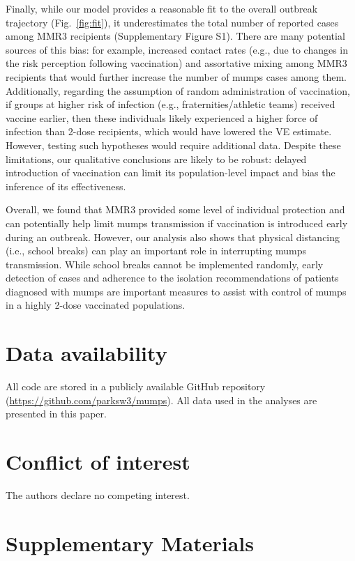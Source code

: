 \documentclass[12pt]{article}
\newcommand{\fref}[1]{Fig.~\ref{fig:#1}}
\begin{document}
Finally, while our model provides a reasonable fit to the overall outbreak trajectory (\fref{fit}), it underestimates the total number of reported cases among MMR3 recipients (Supplementary Figure S1).
There are many potential sources of this bias: for example, increased contact rates (e.g., due to changes in the risk perception following vaccination) and assortative mixing among MMR3 recipients that would further increase the number of mumps cases among them.
Additionally, regarding the assumption of random administration of vaccination, if groups at higher risk of infection (e.g., fraternities/athletic teams) received vaccine earlier, then these individuals likely experienced a higher force of infection than 2-dose recipients, which would have lowered the VE estimate. 
However, testing such hypotheses would require additional data.
Despite these limitations, our qualitative conclusions are likely to be robust: delayed introduction of vaccination can limit its population-level impact and bias the inference of its effectiveness.

Overall, we found that MMR3 provided some level of individual protection and can potentially help limit mumps transmission if vaccination is introduced early during an outbreak.  
However, our analysis also shows that physical distancing (i.e., school breaks) can play an important role in interrupting mumps transmission. 
While school breaks cannot be implemented randomly, early detection of cases and adherence to the isolation recommendations of patients diagnosed with mumps are important measures to assist with control of mumps in a highly 2-dose vaccinated populations.

\section*{Data availability}

All code are stored in a publicly available GitHub repository (\url{https://github.com/parksw3/mumps}). All data used in the analyses are presented in this paper.

\section*{Conflict of interest}

The authors declare no competing interest.

\pagebreak

\section*{Supplementary Materials}
\end{document}
